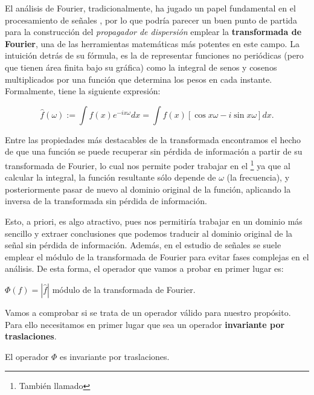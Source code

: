 \noindent El análisis de Fourier, tradicionalmente, ha jugado un papel fundamental en el procesamiento de señales \cite{DigitalImageProcessing}, por lo que podría parecer un buen punto de partida para la construcción del \textit{propagador de dispersión} emplear la \textbf{transformada de Fourier}, una de las herramientas matemáticas más potentes en este campo. La intuición detrás de su fórmula, es la de representar funciones no periódicas (pero que tienen área finita bajo su gráfica) como la integral de senos y cosenos multiplicados por una función que determina los pesos en cada instante. Formalmente, tiene la siguiente expresión:

\begin{equation}
\widehat{f}(\omega):= \int{f(x)e^{-ix\omega}dx}=\int{f(x)\left[\cos{x\omega} -i\sin{x\omega}\right]dx}.
\end{equation}

\noindent Entre las propiedades más destacables de la transformada encontramos el hecho de que una función se puede recuperar sin pérdida de información a partir de su transformada de Fourier, lo cual nos permite poder trabajar en el \footnote{También llamado } ya que al calcular la integral, la función resultante sólo depende de $\omega$ (la frecuencia), y posteriormente pasar de nuevo al dominio original de la función, aplicando la inversa de la transformada sin pérdida de información.

\medskip

\noindent Esto, a priori, es algo atractivo, pues nos permitiría trabajar en un dominio más sencillo y extraer conclusiones que podemos traducir al dominio original de la señal sin pérdida de información. Además, en el estudio de señales se suele emplear el módulo de la transformada de Fourier para evitar fases complejas en el análisis. De esta forma, el operador que vamos a probar en primer lugar es: 

\begin{definicion}
$\Phi(f)=|\widehat{f}|$ módulo de la transformada de Fourier. 
\end{definicion}

\noindent Vamos a comprobar si se trata de un operador válido para nuestro propósito. Para ello necesitamos en primer lugar que sea un operador \textbf{invariante por traslaciones}.

\begin{lema} \label{lema::invarianza_traslaciones}
    El operador $\Phi$ es invariante por traslaciones.
\end{lema}

